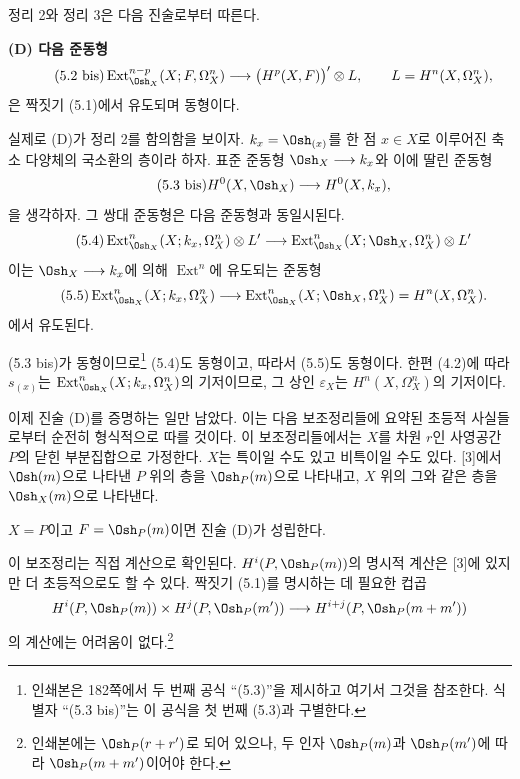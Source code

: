 정리 2와 정리 3은 다음 진술로부터 따른다.

\noindent\textbf{(D) 다음 준동형}
\begin{equation}\tag{5.2 bis}
  \operatorname{Ext}_{\Osh_X}^{n-p}(X;F,\Omega_X^{n})
  \longrightarrow\bigl(H^{p}(X,F)\bigr)'\otimes L,
  \qquad L=H^{n}(X,\Omega_X^{n}),
\end{equation}
은 짝짓기 (5.1)에서 유도되며 동형이다.

실제로 (D)가 정리 2를 함의함을 보이자. $k_x=\Osh_{(x)}$를 한 점
$x\in X$로 이루어진 축소 다양체의 국소환의 층이라 하자. 표준 준동형
$\Osh_X\longrightarrow k_x$와 이에 딸린 준동형
\begin{equation}\tag{5.3 bis}
  H^{0}(X,\Osh_X)\longrightarrow H^{0}(X,k_x),
\end{equation}
을 생각하자. 그 쌍대 준동형은 다음 준동형과 동일시된다.
\begin{equation}\tag{5.4}
  \operatorname{Ext}_{\Osh_X}^{n}(X;k_x,\Omega_X^{n})\otimes L'
  \longrightarrow
  \operatorname{Ext}_{\Osh_X}^{n}(X;\Osh_X,\Omega_X^{n})\otimes L'
\end{equation}
이는 $\Osh_X\longrightarrow k_x$에 의해 $\operatorname{Ext}^{n}$에
유도되는 준동형
\begin{equation}\tag{5.5}
  \operatorname{Ext}_{\Osh_X}^{n}(X;k_x,\Omega_X^{n})
  \longrightarrow
  \operatorname{Ext}_{\Osh_X}^{n}(X;\Osh_X,\Omega_X^{n})
  =H^{n}(X,\Omega_X^{n}).
\end{equation}
에서 유도된다.

(5.3 bis)가 동형이므로\footnote{인쇄본은 182쪽에서 두 번째 공식
“(5.3)”을 제시하고 여기서 그것을 참조한다. 식별자 “(5.3 bis)”는 이
공식을 첫 번째 (5.3)과 구별한다.} (5.4)도 동형이고, 따라서 (5.5)도
동형이다. 한편 (4.2)에 따라 $s_{(x)}$는
$\operatorname{Ext}_{\Osh_X}^{n}(X;k_x,\Omega_X^{n})$의 기저이므로, 그
상인 $\varepsilon_X$는 $H^{n}(X,\Omega_X^{n})$의 기저이다.

이제 진술 (D)를 증명하는 일만 남았다. 이는 다음 보조정리들에 요약된
초등적 사실들로부터 순전히 형식적으로 따를 것이다. 이 보조정리들에서는
$X$를 차원 $r$인 사영공간 $P$의 닫힌 부분집합으로 가정한다. $X$는
특이일 수도 있고 비특이일 수도 있다. [3]에서 $\Osh(m)$으로 나타낸 $P$
위의 층을 $\Osh_P(m)$으로 나타내고, $X$ 위의 그와 같은 층을
$\Osh_X(m)$으로 나타낸다.

 $X=P$이고 $F=\Osh_P(m)$이면 진술 (D)가 성립한다.

이 보조정리는 직접 계산으로 확인된다. $H^{i}(P,\Osh_P(m))$의 명시적
계산은 [3]에 있지만 더 초등적으로도 할 수 있다. 짝짓기 (5.1)를
명시하는 데 필요한 컵곱
\[
  H^{i}(P,\Osh_P(m))\times H^{j}(P,\Osh_P(m'))
  \longrightarrow H^{i+j}(P,\Osh_P(m+m'))
\]
의 계산에는 어려움이 없다.\footnote{인쇄본에는 $\Osh_P(r+r')$로 되어
있으나, 두 인자 $\Osh_P(m)$과 $\Osh_P(m')$에 따라
$\Osh_P(m+m')$이어야 한다.}


